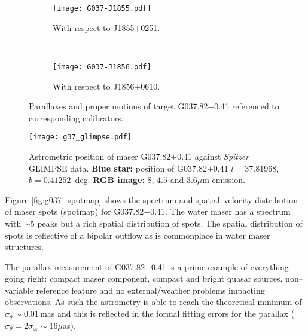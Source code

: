 	        \begin{figure}[h]
	        	\centering
	        	\begin{subfigure}[t]{0.9\textwidth}
	        		\texttt{[image: G037-J1855.pdf]}
	        		\caption{With respect to J1855$+$0251.}
	        	\end{subfigure}
	        	~
	        	\begin{subfigure}[t]{0.9\textwidth}
	        		\texttt{[image: G037-J1856.pdf]}
	        		\caption{With respect to J1856$+$0610.}
	        	\end{subfigure}
	        	\caption[G037.82$+$0.41 Parallax Fit]{Parallaxes and proper motions of target G037.82$+$0.41  referenced to corresponding calibrators.}
	        	\label{fig:per_g037parallax}
	        \end{figure}	       	
	       	
	       	
	       	\begin{SCfigure}[][h]
	       		\centering
	       		\texttt{[image: g37\_glimpse.pdf]}
	       		\caption[G037.82$+$0.41 Sky position]{Astrometric position of \water\space maser G037.82$+$0.41 against {\it Spitzer} GLIMPSE data. \textbf{Blue star:} position of G037.82$+$0.41 $l=37.81968$, $b=0.41252$~deg. \textbf{RGB image:} $8$, $4.5$ and $3.6\mu$m emission.} \label{fig:g037_glimpse}
	       	\end{SCfigure}	     	
	       	
	       	\hyperref[fig:g037_spotmap]{Figure \ref*{fig:g037_spotmap}} shows the spectrum and spatial--velocity distribution of maser spots (spotmap) for G037.82$+$0.41. The water maser has a spectrum with $\sim5$ peaks but a rich spatial distribution of spots. The spatial distribution of spots is reflective of a bipolar outflow as is commonplace in water maser structures.
	       	
	       	The parallax measurement of G037.82$+$0.41 is a prime example of everything going right: compact maser component, compact and bright quasar sources, non--variable reference feature and no external/weather problems impacting observations. As such the astrometry is able to reach the theoretical minimum of $\sigma_\theta\sim0.01$\,mas and this is reflected in the formal fitting errors for the parallax ($\sigma_\theta=2\sigma_\varpi\sim16\mu$as).
	       	
